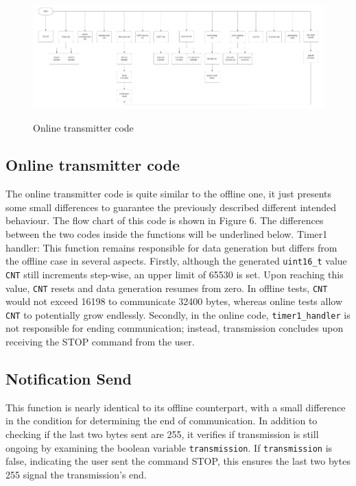 \documentclass{Configuration_Files/PoliMi3i_thesis}
\begin{document}
\begin{figure}[H]
	\includegraphics[scale=0.3]{Previous Implementation/Screenshot 2024-08-15 at 11.01.21.png}
	\centering
    \label{prev_6}
    \caption{Online transmitter code}
\end{figure}

\subsection{Online transmitter code}

The online transmitter code is quite similar to the offline one, it just presents some small differences to guarantee the previously described different intended behaviour. The flow chart of this code is shown in Figure 6. The differences between the two codes inside the functions will be underlined below. 
Timer1 handler: This function remains responsible for data generation but differs from the offline case in several aspects. Firstly, although the generated \texttt{uint16\_t} value \texttt{CNT} still increments step-wise, an upper limit of 65530 is set. Upon reaching this value, \texttt{CNT} resets and data generation resumes from zero. In offline tests, \texttt{CNT} would not exceed 16198 to communicate 32400 bytes, whereas online tests allow \texttt{CNT} to potentially grow endlessly. Secondly, in the online code, \texttt{timer1\_handler} is not responsible for ending communication; instead, transmission concludes upon receiving the STOP command from the user.

\subsection*{Notification Send}
This function is nearly identical to its offline counterpart, with a small difference in the condition for determining the end of communication. In addition to checking if the last two bytes sent are 255, it verifies if transmission is still ongoing by examining the boolean variable \texttt{transmission}. If \texttt{transmission} is false, indicating the user sent the command STOP, this ensures the last two bytes 255 signal the transmission's end.
\end{document}
